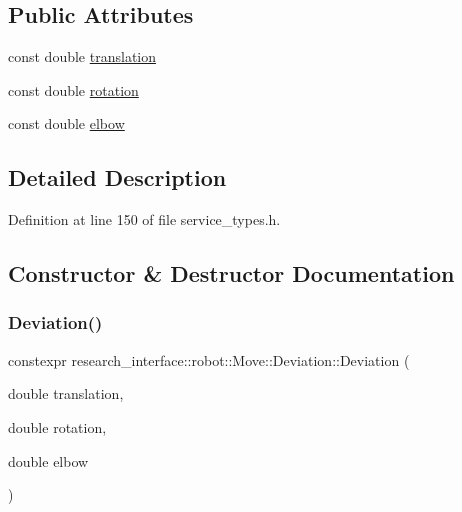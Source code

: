 \subsection*{Public Attributes}
\begin{DoxyCompactItemize}
\item 
const double \hyperlink{structresearch__interface_1_1robot_1_1Move_1_1Deviation_a6e931e7573151ebdc78bea671357c034}{translation}
\item 
const double \hyperlink{structresearch__interface_1_1robot_1_1Move_1_1Deviation_a816c4e4265f821e02abe8e524312c8fe}{rotation}
\item 
const double \hyperlink{structresearch__interface_1_1robot_1_1Move_1_1Deviation_af769b3fba182ec577c0b64fc1dedce72}{elbow}
\end{DoxyCompactItemize}


\subsection{Detailed Description}


Definition at line 150 of file service\+\_\+types.\+h.



\subsection{Constructor \& Destructor Documentation}
\mbox{\label{structresearch__interface_1_1robot_1_1Move_1_1Deviation_a22cbf93aef5b9c82995343d5c50bb5b8}} 
\subsubsection{\texorpdfstring{Deviation()}{Deviation()}}
{\footnotesize\ttfamily constexpr research\+\_\+interface\+::robot\+::\+Move\+::\+Deviation\+::\+Deviation (\begin{DoxyParamCaption}\item[{double}]{translation,  }\item[{double}]{rotation,  }\item[{double}]{elbow }\end{DoxyParamCaption})\hspace{0.3cm}{\ttfamily [inline]}}



